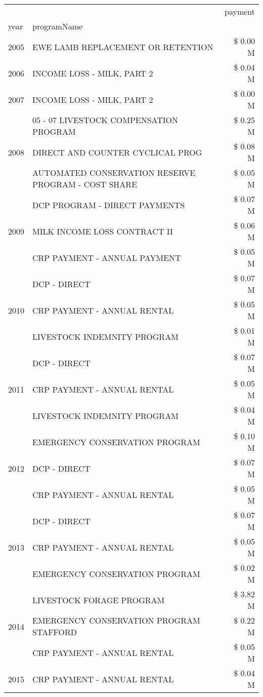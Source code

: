 \begin{tabular}{llr}
\toprule
 &  & payment \\
year & programName &  \\
\midrule
2005 & EWE LAMB REPLACEMENT OR RETENTION & \$ 0.00 M \\
\cline{1-3}
2006 & INCOME LOSS - MILK, PART 2 & \$ 0.04 M \\
\cline{1-3}
2007 & INCOME LOSS - MILK, PART 2 & \$ 0.00 M \\
\cline{1-3}
\multirow[t]{3}{*}{2008} & 05 - 07 LIVESTOCK COMPENSATION PROGRAM & \$ 0.25 M \\
 & DIRECT AND COUNTER CYCLICAL PROG & \$ 0.08 M \\
 & AUTOMATED CONSERVATION RESERVE PROGRAM - COST SHARE & \$ 0.05 M \\
\cline{1-3}
\multirow[t]{3}{*}{2009} & DCP PROGRAM - DIRECT PAYMENTS & \$ 0.07 M \\
 & MILK INCOME LOSS CONTRACT II & \$ 0.06 M \\
 & CRP PAYMENT - ANNUAL PAYMENT & \$ 0.05 M \\
\cline{1-3}
\multirow[t]{3}{*}{2010} & DCP - DIRECT & \$ 0.07 M \\
 & CRP PAYMENT - ANNUAL RENTAL & \$ 0.05 M \\
 & LIVESTOCK INDEMNITY PROGRAM & \$ 0.01 M \\
\cline{1-3}
\multirow[t]{3}{*}{2011} & DCP - DIRECT & \$ 0.07 M \\
 & CRP PAYMENT - ANNUAL RENTAL & \$ 0.05 M \\
 & LIVESTOCK INDEMNITY PROGRAM & \$ 0.04 M \\
\cline{1-3}
\multirow[t]{3}{*}{2012} & EMERGENCY CONSERVATION PROGRAM & \$ 0.10 M \\
 & DCP - DIRECT & \$ 0.07 M \\
 & CRP PAYMENT - ANNUAL RENTAL & \$ 0.05 M \\
\cline{1-3}
\multirow[t]{3}{*}{2013} & DCP - DIRECT & \$ 0.07 M \\
 & CRP PAYMENT - ANNUAL RENTAL & \$ 0.05 M \\
 & EMERGENCY CONSERVATION PROGRAM & \$ 0.02 M \\
\cline{1-3}
\multirow[t]{3}{*}{2014} & LIVESTOCK FORAGE PROGRAM & \$ 3.82 M \\
 & EMERGENCY CONSERVATION PROGRAM STAFFORD & \$ 0.22 M \\
 & CRP PAYMENT - ANNUAL RENTAL & \$ 0.05 M \\
\cline{1-3}
\multirow[t]{3}{*}{2015} & CRP PAYMENT - ANNUAL RENTAL & \$ 0.04 M \\

\end{tabular}
